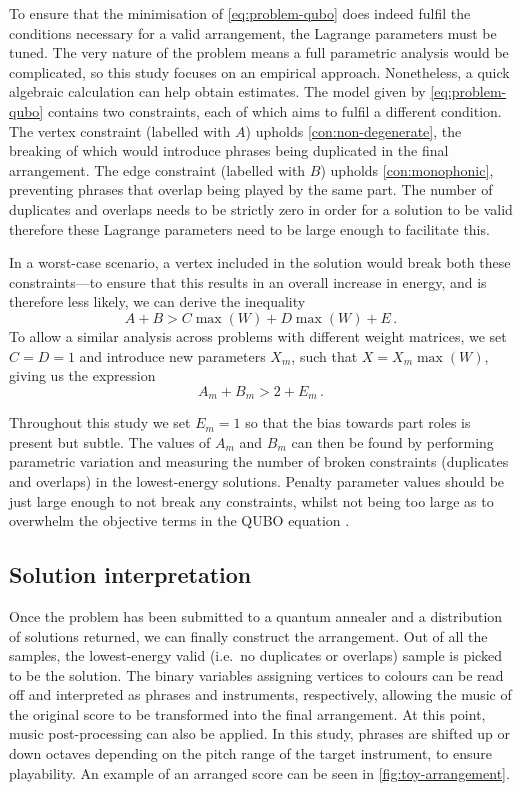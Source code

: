 \documentclass[12pt]{article}
\theoremstyle{definition}
\begin{document}
To ensure that the minimisation of \cref{eq:problem-qubo} does indeed fulfil the conditions necessary for a valid arrangement, the Lagrange parameters must be tuned. The very nature of the problem means a full parametric analysis would be complicated, so this study focuses on an empirical approach.
Nonetheless, a quick algebraic calculation can help obtain estimates. The model given by \cref{eq:problem-qubo} contains two constraints, each of which aims to fulfil a different condition. The vertex constraint (labelled with $A$) upholds \cref{con:non-degenerate}, the breaking of which would introduce phrases being duplicated in the final arrangement. The edge constraint (labelled with $B$) upholds \cref{con:monophonic}, preventing phrases that overlap being played by the same part. The number of duplicates and overlaps needs to be strictly zero in order for a solution to be valid therefore these Lagrange parameters need to be large enough to facilitate this.

In a worst-case scenario, a vertex included in the solution would break both these constraints---to ensure that this results in an overall increase in energy, and is therefore less likely, we can derive the inequality
\begin{equation}
    A + B > C\max(W) + D\max(W) + E \,.
\end{equation}
To allow a similar analysis across problems with different weight matrices, we set ${C=D=1}$ and introduce new parameters $X_m$, such that ${X = X_m\max(W)}$, giving us the expression
\begin{equation}
    A_m + B_m > 2 + E_m \,.
    \label{eq:lagrange}
\end{equation}

Throughout this study we set $E_m=1$ so that the bias towards part roles is present but subtle. The values of $A_m$ and $B_m$ can then be found by performing parametric variation and measuring the number of broken constraints (duplicates and overlaps) in the lowest-energy solutions. Penalty parameter values should be just large enough to not break any constraints, whilst not being too large as to overwhelm the objective terms in the QUBO equation \cite{au-yeung_np-hard_2023}.

\subsection{Solution interpretation}

Once the problem has been submitted to a quantum annealer and a distribution of solutions returned, we can finally construct the arrangement. Out of all the samples, the lowest-energy valid (i.e.\ no duplicates or overlaps) sample is picked to be the solution. The binary variables assigning vertices to colours can be read off and interpreted as phrases and instruments, respectively, allowing the music of the original score to be transformed into the final arrangement.
At this point, music post-processing can also be applied. In this study, phrases are shifted up or down octaves depending on the pitch range of the target instrument, to ensure playability. An example of an arranged score can be seen in \cref{fig:toy-arrangement}.
\end{document}
